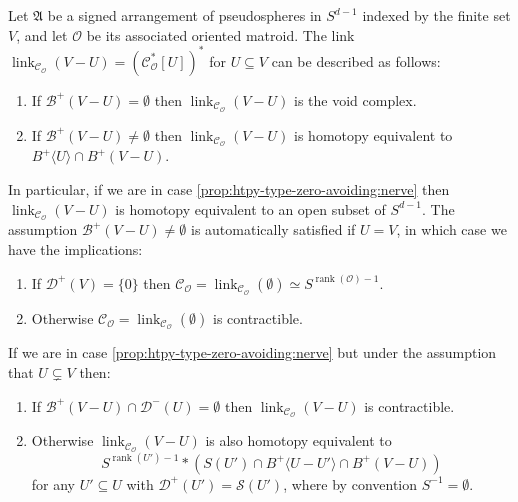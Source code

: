 \documentclass[10pt,a4paper]{amsart}
\DeclareMathOperator{\link}{\mathrm{link}}
\begin{document}
\begin{proposition}\label{prop:htpy-type-zero-avoiding}
    Let $\mathfrak{A}$ be a signed arrangement of pseudospheres in $S^{d-1}$ indexed by the finite set $V$, and let $\mathscr{O}$ be its associated oriented matroid. The link $\link_{\mathscr{C}_\mathscr{O}}(V-U)=(\mathscr{C}^*_{\mathscr{O}}[U])^*$ for $U\subseteq V$ can be described as follows:
    \begin{enumerate}[label=\normalfont{(\arabic*)}]
        \item\label{prop:htpy-type-zero-avoiding:void} If $\mathscr{B}^+(V-U)=\emptyset$ then $\link_{\mathscr{C}_{\mathscr{O}}}(V-U)$ is the void complex.
        \item\label{prop:htpy-type-zero-avoiding:nerve} If $\mathscr{B}^+(V-U)\neq\emptyset$ then $\link_{\mathscr{C}_{\mathscr{O}}}(V-U)$ is homotopy equivalent to $B^+\langle U\rangle\cap B^+(V-U)$.
    \end{enumerate}
    In particular, if we are in case \ref{prop:htpy-type-zero-avoiding:nerve} then $\link_{\mathscr{C}_\mathscr{O}}(V-U)$ is homotopy equivalent to an open subset of $S^{d-1}$. The assumption $\mathscr{B}^+(V-U)\neq\emptyset$ is automatically satisfied if $U=V$, in which case we have the implications:
    \begin{enumerate}[label=\normalfont{(2.\arabic*)}]
        \item\label{prop:htpy-type-zero-avoiding:sphere} If $\mathscr{D}^+(V)=\{0\}$ then $\mathscr{C}_\mathscr{O}=\link_{\mathscr{C}_\mathscr{O}}(\emptyset)\simeq S^{\operatorname{rank}(\mathscr{O})-1}$.
        \item\label{prop:htpy-type-zero-avoiding:entire-contr} Otherwise $\mathscr{C}_\mathscr{O}=\link_{\mathscr{C}_\mathscr{O}}(\emptyset)$ is contractible.
    \end{enumerate}
    If we are in case \ref{prop:htpy-type-zero-avoiding:nerve} but under the assumption that $U\subsetneq V$ then:
    \begin{enumerate}[resume,label=\normalfont{(2.\arabic*)}]
        \item\label{prop:htpy-type-zero-avoiding:non-Farkas} If $\mathscr{B}^+(V-U)\cap \mathscr{D}^-(U)=\emptyset$ then $\link_{\mathscr{C}_{\mathscr{O}}}(V-U)$ is contractible.
        \item\label{prop:htpy-type-zero-avoiding:boundary} Otherwise $\link_{\mathscr{C}_\mathscr{O}}(V-U)$ is also homotopy equivalent to
        \[
            S^{\operatorname{rank}(U')-1}*\left(S(U')\cap B^+\langle U-U'\rangle\cap B^+(V-U)\right)
        \]
        for any $U'\subseteq U$ with $\mathscr{D}^+(U')=\mathscr{S}(U')$, where by convention $S^{-1}=\emptyset$.
    \end{enumerate}
\end{proposition}
\end{document}
